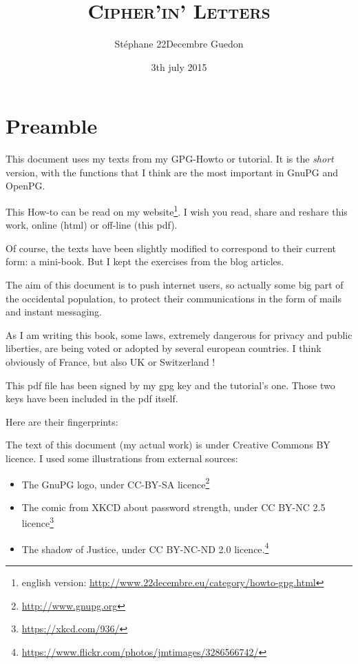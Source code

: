 \documentclass[10pt,a4paper,openany]{book}
\title{\scshape Cipher'in' Letters}
\author{Stéphane 22Decembre Guedon}
\date{3th july 2015}
\begin{document}
	\maketitle

	\chapter{Preamble}
	
	This document uses my texts from my GPG-Howto or tutorial. It is the \textit{short} version, with the functions that I think are the most important in GnuPG and OpenPG.
	
	This How-to can be read on my website\footnote{english version: \url{http://www.22decembre.eu/category/howto-gpg.html}}. I wish you read, share and reshare this work, online (html) or off-line (this pdf).
	
	Of course, the texts have been slightly modified to correspond to their current form: a mini-book. But I kept the exercises from the blog articles.
	
	The aim of this document is to push internet users, so actually some big part of the occidental population, to protect their communications in the form of mails and instant messaging.
	
	As I am writing this book, some laws, extremely dangerous for privacy and public liberties, are being voted or adopted by several european countries. I think obviously of France, but also UK or Switzerland !
	
	This pdf file has been signed by my gpg key and the tutorial's one. Those two keys have been included in the pdf itself.
	
	Here are their fingerprints:
	
	\begin{center}
	\end{center}
	\begin{center}
	\end{center}
	
	The text of this document (my actual work) is under Creative Commons BY licence. I used some illustrations from external sources:
	\begin{itemize}
		\item The GnuPG logo, under CC-BY-SA licence\footnote{\url{http://www.gnupg.org}}
		\item The comic from XKCD about password strength, under CC BY-NC 2.5 licence\footnote{\url{https://xkcd.com/936/}}
		\item The shadow of Justice, under CC BY-NC-ND 2.0 licence.\footnote{\url{https://www.flickr.com/photos/jmtimages/3286566742/}}
	\end{itemize}
	
\end{document}
